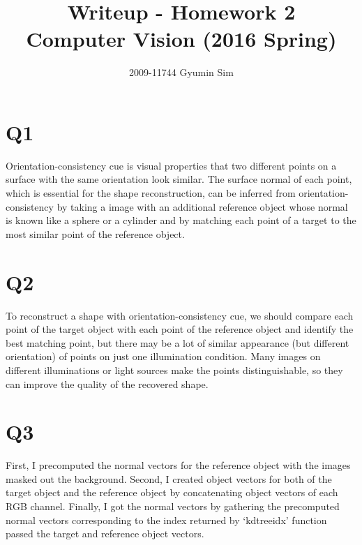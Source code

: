 \documentclass[a4paper,10pt]{article}
\begin{document}
\title{Writeup - Homework 2 \\
  \large Computer Vision (2016 Spring)}
\author{2009-11744 Gyumin Sim}
\maketitle

\section*{Q1}

Orientation-consistency cue is visual properties that two different points on a surface with the same orientation look similar.
The surface normal of each point, which is essential for the shape reconstruction, can be inferred from orientation-consistency by taking a image with an additional reference object whose normal is known like a sphere or a cylinder and by matching each point of a target to the most similar point of the reference object.

\section*{Q2}

To reconstruct a shape with orientation-consistency cue, we should compare each point of the target object with each point of the reference object and identify the best matching point, but there may be a lot of similar appearance (but different orientation) of points on just one illumination condition.
Many images on different illuminations or light sources make the points distinguishable, so they can improve the quality of the recovered shape.

\section*{Q3}

First, I precomputed the normal vectors for the reference object with the images masked out the background.
Second, I created object vectors for both of the target object and the reference object by concatenating object vectors of each RGB channel.
Finally, I got the normal vectors by gathering the precomputed normal vectors corresponding to the index returned by `kdtreeidx' function passed the target and reference object vectors.
\end{document}
